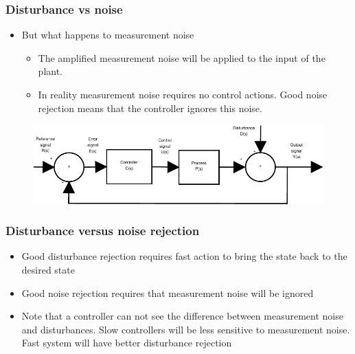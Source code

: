 \begin{frame}
	\frametitle{Disturbance vs noise}
	\begin{itemize}
		\item But what happens to measurement noise
		\begin{itemize}
			\item The amplified measurement noise will be applied to the input of the plant.
			\item In reality measurement noise requires no control actions. Good noise rejection means that the controller ignores this noise.
		\end{itemize}
	\end{itemize}
	\begin{figure}
\centering
\includegraphics[width=0.7\linewidth]{Closed-Loop}
\label{fig:Closed-Loop5}
\end{figure}
\end{frame}


\begin{frame}
	\frametitle{Disturbance versus noise rejection}
	\begin{itemize}
		\item Good disturbance rejection requires fast action to bring the state back to the desired state
		\item Good noise rejection requires that measurement noise will be ignored
		\item Note that a controller can not see the difference between measurement noise and disturbances. Slow controllers will be less sensitive to measurement noise. Fast system will have better disturbance rejection
	\end{itemize}
\end{frame}

